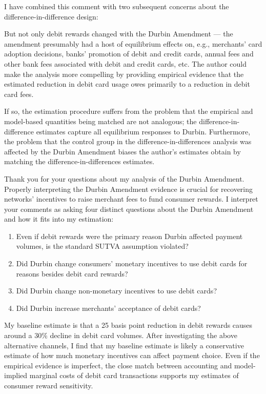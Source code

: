 \documentclass[main.tex]{subfiles}
\begin{document}
\begin{refsection}
I have combined this comment with two subsequent concerns about the difference-in-difference design:

\begin{refcommentnoclear}
    But not only debit rewards changed with the Durbin Amendment — the amendment presumably had a host of equilibrium effects on, e.g., merchants' card adoption decisions, banks' promotion of debit and credit cards, annual fees and other bank fees associated with debit and credit cards, etc.
The author could make the analysis more compelling by providing empirical evidence that the estimated reduction in debit card usage owes primarily to a reduction in debit card fees.
\end{refcommentnoclear}

\begin{refcommentnoclear}
    If so, the estimation procedure suffers from the problem that the empirical and model-based quantities being matched are not analogous; the difference-in-difference estimates capture all equilibrium responses to Durbin.
Furthermore, the problem that the control group in the difference-in-differences analysis was affected by the Durbin Amendment biases the author's estimates obtain by matching the difference-in-differences estimates.
\end{refcommentnoclear}

Thank you for your questions about my analysis of the Durbin Amendment.
Properly interpreting the Durbin Amendment evidence is crucial for recovering networks' incentives to raise merchant fees to fund consumer rewards.
I interpret your comments as asking four distinct questions about the Durbin Amendment and how it fits into my estimation:

 \begin{enumerate}
    \item Even if debit rewards were the primary reason Durbin affected payment volumes, is the standard SUTVA assumption violated?
    \item Did Durbin change consumers' monetary incentives to use debit cards for reasons besides debit card rewards?
    \item Did Durbin change non-monetary incentives to use debit cards?
    \item Did Durbin increase merchants' acceptance of debit cards?
 \end{enumerate}

My baseline estimate is that a 25 basis point reduction in debit rewards causes around a 30\% decline in debit card volumes.
After investigating the above alternative channels, I find that my baseline estimate is likely a conservative estimate of how much monetary incentives can affect payment choice.
Even if the empirical evidence is imperfect, the close match between accounting and model-implied marginal costs of debit card transactions supports my estimates of consumer reward sensitivity.


\end{refsection}
\end{document}
